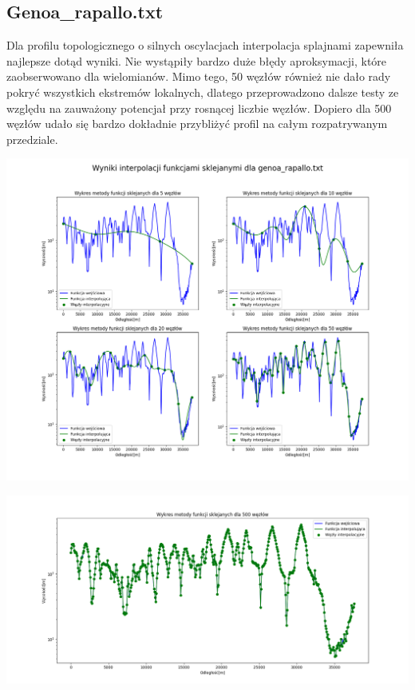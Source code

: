 \documentclass[a4paper,12pt]{article}
\begin{document}
   	\subsection{Genoa\_rapallo.txt}
	Dla profilu topologicznego o silnych oscylacjach interpolacja splajnami zapewniła najlepsze dotąd wyniki. Nie wystąpiły bardzo duże błędy aproksymacji, które zaobserwowano dla wielomianów. Mimo tego, 50 węzłów również nie dało rady pokryć wszystkich ekstremów lokalnych, dlatego przeprowadzono dalsze testy ze względu na zauważony potencjał przy rosnącej liczbie węzłów. Dopiero dla 500 węzłów udało się bardzo dokładnie przybliżyć profil na całym rozpatrywanym przedziale.
	\begin{center}
        \includegraphics[scale=0.4]{../charts/cubic_spline_genoa_rapallo.png}
    \end{center}
    \begin{center}
        \includegraphics[scale=0.4]{../charts/cubic_spline_500_genoa_rapallo.png}
    \end{center}
    
\end{document}
